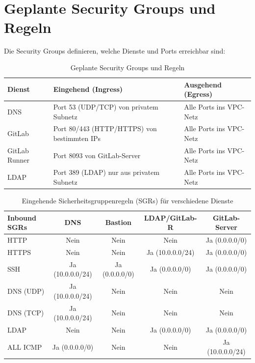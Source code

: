 \documentclass[a4paper,12pt]{article}
\begin{document}
\section{Geplante Security Groups und Regeln}
Die Security Groups definieren, welche Dienste und Ports erreichbar sind:

\begin{table}[h!]
    \centering
    \begin{tabular}{|l|l|l|}
    \hline
    \textbf{Dienst}      & \textbf{Eingehend (Ingress)}          & \textbf{Ausgehend (Egress)}         \\ \hline
    DNS                 & Port 53 (UDP/TCP) von privatem Subnetz & Alle Ports ins VPC-Netz             \\ \hline
    GitLab              & Port 80/443 (HTTP/HTTPS) von bestimmten IPs & Alle Ports ins VPC-Netz             \\ \hline
    GitLab Runner       & Port 8093 von GitLab-Server            & Alle Ports ins VPC-Netz             \\ \hline
    LDAP                & Port 389 (LDAP) nur aus privatem Subnetz & Alle Ports ins VPC-Netz             \\ \hline
    \end{tabular}
    \caption{Geplante Security Groups und Regeln}
\end{table}

\begin{table}[h!]
    \centering
    \begin{tabular}{|l|c|c|c|c|}
    \hline
    \textbf{Inbound SGRs} & \textbf{DNS}              & \textbf{Bastion}         & \textbf{LDAP/GitLab-R}    & \textbf{GitLab-Server}    \\ \hline
    HTTP                  & Nein                      & Nein                     & Nein                      & Ja (0.0.0.0/0)           \\ \hline
    HTTPS                 & Nein                      & Nein                     & Ja (10.0.0.0/24)          & Ja (0.0.0.0/0)           \\ \hline
    SSH                   & Ja (10.0.0.0/24)          & Ja (0.0.0.0/0)           & Ja (0.0.0.0/0)            & Ja (0.0.0.0/0)           \\ \hline
    DNS (UDP)             & Ja (10.0.0.0/24)          & Nein                     & Nein                      & Nein                     \\ \hline
    DNS (TCP)             & Ja (10.0.0.0/24)          & Nein                     & Nein                      & Nein                     \\ \hline
    LDAP                  & Nein                      & Nein                     & Ja (0.0.0.0/0)            & Ja (0.0.0.0/0)           \\ \hline
    ALL ICMP              & Ja (0.0.0.0/0)            & Nein                     & Nein                      & Ja (10.0.0.0/24)         \\ \hline
    \end{tabular}
    \caption{Eingehende Sicherheitsgruppenregeln (SGRs) für verschiedene Dienste}
    \label{tab:inbound-sgrs}
\end{table}
\end{document}
